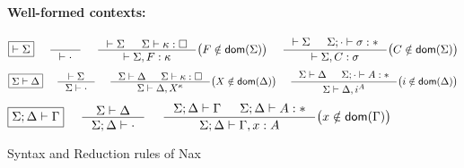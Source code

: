 \begin{figure}
\begin{framed}
\paragraph{Well-formed contexts:}
\[ \fbox{$|- \Sigma$}
 ~~~~
   \inference{}{|- \cdot}
 ~~~~
   \inference{|- \Sigma & \Sigma |- \kappa:\square}
             {|- \Sigma,F:\kappa}
      \big( F\notin\dom(\Sigma) \big)
 ~~~~
   \inference{|- \Sigma & \Sigma;\cdot |- \sigma:*}
             {|- \Sigma,C:\sigma}
      \big( C\notin\dom(\Sigma) \big)
\]
\[ \fbox{$\Sigma|- \Delta$}
 ~~~~
   \inference{|- \Sigma}{\Sigma |- \cdot}
 ~~~~
   \inference{\Sigma |- \Delta & \Sigma |- \kappa:\square}
             {\Sigma |- \Delta,X^\kappa}
      \big( X\notin\dom(\Delta) \big)
 ~~~~ 
   \inference{\Sigma |- \Delta & \Sigma;\cdot |- A:*}
             {\Sigma |- \Delta,i^A}
      \big( i\notin\dom(\Delta) \big)
\]
\[ \fbox{$\Sigma;\Delta |- \Gamma$}
 ~~~~
   \inference{\Sigma |- \Delta}{\Sigma;\Delta |- \cdot}
 ~~~~
   \inference{\Sigma;\Delta |- \Gamma & \Sigma;\Delta |- A:*}
             {\Sigma;\Delta |- \Gamma,x:A}
      \big( x\notin\dom(\Gamma) \big)
\]
\end{framed}
\caption{Syntax and Reduction rules of Nax}
\label{fig:NaxSyntax}
\end{figure}

